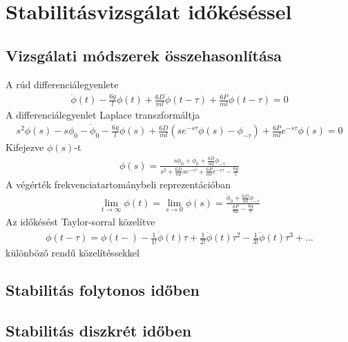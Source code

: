 \chapter{Stabilitásvizsgálat időkéséssel}\label{chap:time_delay_stability}

\section{Vizsgálati módszerek összehasonlítása}
A rúd differenciálegyenlete
\begin{align}
    \ddot\phi\left(t\right) - \frac{6g}{l}\phi\left(t\right) + 
    \frac{6D}{ml}\dot\phi\left(t-\tau\right) + \frac{6P}{ml}\phi\left(t-\tau\right) = 0
\end{align}
A differenciálegyenlet Laplace transzformáltja
\begin{align}
    s^2\phi\left(s\right) - s\phi_0 - \dot\phi_0 - 
    \frac{6g}{l}\phi\left(s\right) + 
    \frac{6D}{ml}\left(se^{-s\tau}\phi\left(s\right)-\phi_{-\tau}\right) + 
    \frac{6P}{ml}e^{-s\tau}\phi\left(s\right) = 0 
\end{align}
Kifejezve $\phi\left(s\right)$-t
\begin{align}
    \phi\left(s\right) = \frac{s\phi_0+\dot\phi_0+\frac{6D}{ml}\phi_{-\tau}}{s^2+\frac{6D}{ml}se^{-s\tau}+\frac{6P}{ml}e^{-s\tau}-\frac{6g}{l}}
\end{align}
A végérték frekvenciatartománybeli reprezentációban
\begin{align}
    \lim_{t \to \infty}\phi\left(t\right) = 
    \lim_{s \to 0} \phi\left(s\right) = 
    \frac{\dot\phi_0+\frac{6D}{ml}\phi_{-\tau}}{\frac{6P}{ml}-\frac{6g}{l}}
\end{align}
Az időkésést Taylor-sorral közelítve
\begin{align}
    \phi\left(t-\tau\right) = \phi\left(t-\right) - 
    \frac{1}{1!}\dot\phi\left(t\right)\tau + 
    \frac{1}{2!}\ddot\phi\left(t\right)\tau^2 - 
    \frac{1}{3!}\dddot\phi\left(t\right)\tau^3 + \ldots
\end{align}
különböző rendű közelítéssekkel

\section{Stabilitás folytonos időben}

\section{Stabilitás diszkrét időben}